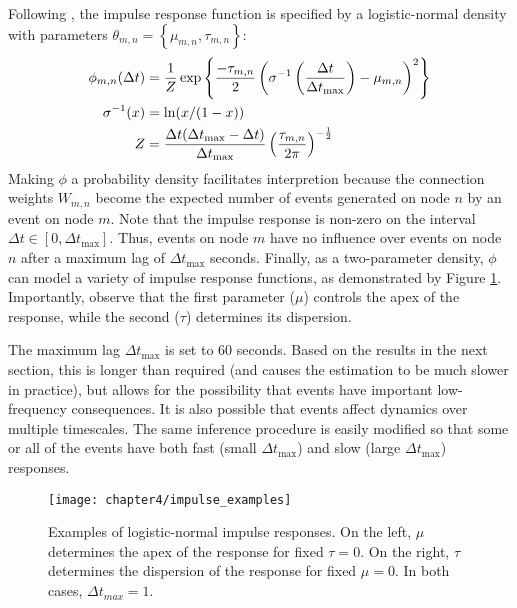 		Following \cite{Linderman2015}, the impulse response function is specified by a logistic-normal density with parameters $\theta_{m , n} = \left \{ \mu_{m , n}, \tau_{m , n} \right \}$:
		\begin{align}
		\phi_{m, n}(\Delta t) &= \frac{1}{Z} \exp \left \{ \frac{-\tau_{m , n}}{2} \left( \sigma^{-1} \left( \frac{\Delta t}{\Delta t_{\text{max}}} \right) - \mu_{m , n} \right)^2  \right \} \notag \\
		\sigma^{-1}(x) &= \ln(x/(1-x)) \notag \\
		Z &= \frac{\Delta t (\Delta t_{\text{max}} - \Delta t)}{\Delta t_{\text{max}}} \left( \frac{\tau_{m , n}}{2 \pi} \right)^{-\frac{1}{2}}
		\end{align}
		Making $\phi$ a probability density facilitates interpretion because the connection weights $W_{m,n}$ become the expected number of events generated on node $n$ by an event on node $m$. Note that the impulse response is non-zero on the interval $\Delta t \in [0, \Delta t_{\text{max}}]$. Thus, events on node $m$ have no influence over events on node $n$ after a maximum lag of $\Delta t_{\text{max}}$ seconds. Finally, as a two-parameter density, $\phi$ can model a variety of impulse response functions, as demonstrated by Figure \ref{fig:impulse_examples}. Importantly, observe that the first parameter ($\mu$) controls the apex of the response, while the second ($\tau$) determines its dispersion.

		The maximum lag $\Delta t_{\text{max}}$ is set to 60 seconds. Based on the results in the next section, this is longer than required (and causes the estimation to be much slower in practice), but allows for the possibility that events have important low-frequency consequences. It is also possible that events affect dynamics over multiple timescales. The same inference procedure is easily modified so that some or all of the events have both fast (small $\Delta t_{\text{max}}$) and slow (large $\Delta t_{\text{max}}$) responses.

		\begin{figure}[t]
			\small
			\linespread{1}
			\centering
			\texttt{[image: chapter4/impulse\_examples]}
			\captionsetup{skip=-20pt, labelsep=colon, font=footnotesize, width=\linewidth}
			\caption[Examples of logistic-normal impulse responses]{Examples of logistic-normal impulse responses. On the left, $\mu$ determines the apex of the response for fixed $\tau=0$. On the right, $\tau$ determines the dispersion of the response for fixed $\mu=0$. In both cases, $\Delta t_{max} = 1$.}
			\label{fig:impulse_examples}
		\end{figure}

